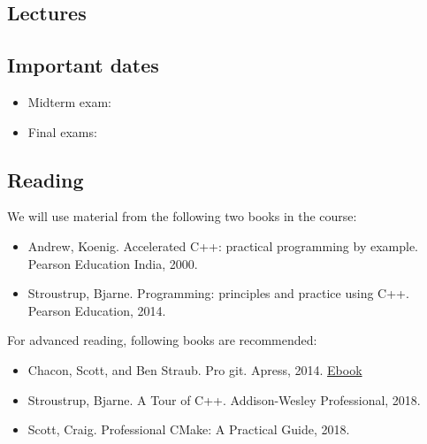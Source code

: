 \documentclass[11pt,letterpaper]{article}
\begin{document}
\subsection*{Lectures}

\subsection*{Important dates}
\begin{itemize}
\item Midterm exam:
\item Final exams:

\end{itemize}
\subsection*{Reading}

We will use material from the following two books in the course:

\begin{itemize}
\item Andrew, Koenig. Accelerated C++: practical programming by example. Pearson Education India, 2000.
\item Stroustrup, Bjarne. Programming: principles and practice using C++. Pearson Education, 2014.
\end{itemize}

For advanced reading, following books are recommended:

\begin{itemize}
\item Chacon, Scott, and Ben Straub. Pro git. Apress, 2014. \href{https://github.com/progit/progit2/releases/download/2.1.146/progit.pdf}{Ebook}
\item Stroustrup, Bjarne. A Tour of C++. Addison-Wesley Professional, 2018.
\item Scott, Craig. Professional CMake: A Practical Guide, 2018.
\end{itemize}

\end{document}

